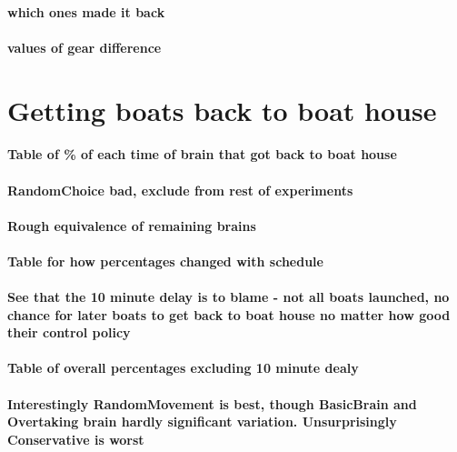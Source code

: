   \paragraph{which ones made it back}
  \paragraph{values of gear difference}
    
\section{Getting boats back to boat house}
  \paragraph{Table of \% of each time of brain that got back to boat house}
  
  \paragraph{RandomChoice bad, exclude from rest of experiments}
  
  \paragraph{Rough equivalence of remaining brains}
  
  \paragraph{Table for how percentages changed with schedule}
  
  \paragraph{See that the 10 minute delay is to blame - not all boats launched, no chance for later boats to get back to boat house no matter how good their control policy}
  
  \paragraph{Table of overall percentages excluding 10 minute dealy}
  
  \paragraph{Interestingly RandomMovement is best, though BasicBrain and Overtaking brain hardly significant variation. Unsurprisingly Conservative is worst}
  
